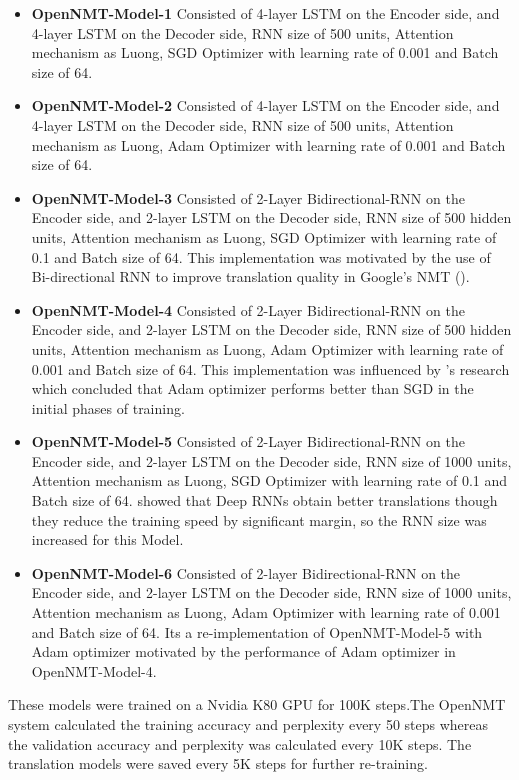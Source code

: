 \begin{itemize}
    \item \textbf{OpenNMT-Model-1} Consisted of 4-layer LSTM on the Encoder side, and 4-layer LSTM on the Decoder side, RNN size of 500 units, Attention mechanism as Luong, SGD Optimizer with learning rate of 0.001 and Batch size of 64. 
    \item \textbf{OpenNMT-Model-2} Consisted of 4-layer LSTM on the Encoder side, and 4-layer LSTM on the Decoder side, RNN size of 500 units, Attention mechanism as Luong, Adam Optimizer with learning rate of 0.001 and Batch size of 64. 
    \item \textbf{OpenNMT-Model-3}  Consisted of 2-Layer Bidirectional-RNN on the Encoder side, and 2-layer LSTM on the Decoder side, RNN size of 500 hidden units, Attention mechanism as Luong, SGD Optimizer with learning rate of 0.1 and Batch size of 64. This implementation was motivated by the use of Bi-directional RNN to improve translation quality in Google's NMT (\cite{45610}).
    \item \textbf{OpenNMT-Model-4}  Consisted of 2-Layer Bidirectional-RNN on the Encoder side, and 2-layer LSTM on the Decoder side, RNN size of 500 hidden units, Attention mechanism as Luong, Adam Optimizer with learning rate of 0.001 and Batch size of 64. This implementation was influenced by \cite{DBLP:journals/corr/abs-1712-07628}'s research which concluded that Adam optimizer performs better than SGD in the initial phases of training.
    \item \textbf{OpenNMT-Model-5}  Consisted of 2-Layer Bidirectional-RNN on the Encoder side, and 2-layer LSTM on the Decoder side, RNN size of 1000 units, Attention mechanism as Luong, SGD Optimizer with learning rate of 0.1 and Batch size of 64.\cite{DBLP:journals/corr/BaroneHSHB17} showed that Deep RNNs obtain better translations though they reduce the training speed by significant margin, so the RNN size was increased for this Model.
    \item \textbf{OpenNMT-Model-6} Consisted of 2-layer Bidirectional-RNN on the Encoder side, and 2-layer LSTM on the Decoder side, RNN size of 1000 units, Attention mechanism as Luong, Adam Optimizer with learning rate of 0.001 and Batch size of 64. Its a re-implementation of OpenNMT-Model-5 with Adam optimizer motivated by the performance of Adam optimizer in OpenNMT-Model-4. 
    
\end{itemize}

These models were trained on a Nvidia K80 GPU for 100K steps.The OpenNMT system calculated the training accuracy and perplexity every 50 steps whereas the validation accuracy and perplexity was calculated every 10K steps. The translation models were saved every 5K steps for further re-training. 

